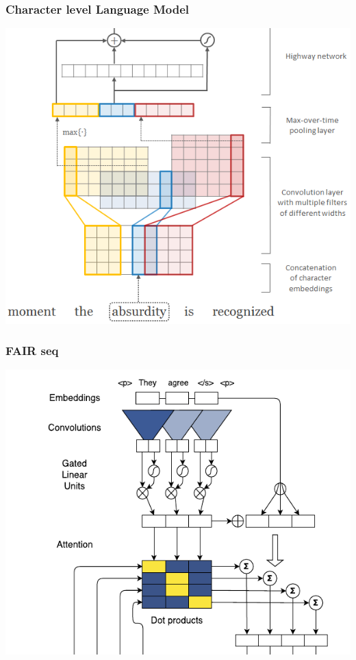 \documentclass[11pt]{article}
\makeatletter
\def\maxwidth{\ifdim\Gin@nat@width>\linewidth\linewidth
    \else\Gin@nat@width\fi}
\let\Oldincludegraphics\includegraphics
\renewcommand{\includegraphics}[1]{\Oldincludegraphics[width=.8\maxwidth]{#1}}
\makeatother
\begin{document}
    \hypertarget{character-level-language-model}{%
\subsubsection{Character level Language
Model}\label{character-level-language-model}}

\includegraphics{./network.png}

    \hypertarget{fair-seq}{%
\subsubsection{FAIR seq}\label{fair-seq}}

\includegraphics{./fair.png}
\end{document}
